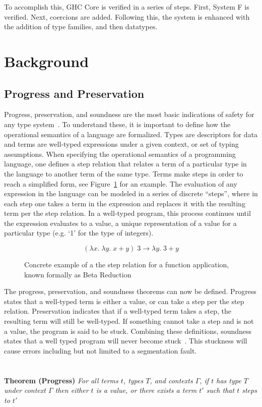 \documentclass{sig-alternate}
\begin{document}
To accomplish this, GHC Core is verified in a series of steps. First, System F is verified. Next, coercions are added. Following this, the system is enhanced with the addition of type families, and then datatypes.

\section{Background}
\label{sec:background}
\subsection{Progress and Preservation}
Progress, preservation, and soundness are the most basic indications of safety for any type system~\cite{Pierce:TAPL}. To understand these, it is important to define how the operational semantics of a language are formalized. Types are descriptors for data and terms are well-typed expressions under a given context, or set of typing assumptions. When specifying the operational semantics of a programming language, one defines a step relation that relates a term of a particular type in the language to another term of the same type. Terms make steps in order to reach a simplified form, see Figure~\ref{fig:step-ex} for an example. The evaluation of any expression in the language can be modeled in a series of discrete ``steps'', where in each step one takes a term in the expression and replaces it with the resulting term per the step relation. In a well-typed program, this process continues until the expression evaluates to a value, a unique representation of a value for a particular type (e.g. `1' for the type of integers).

\begin{figure}[h!]
  $$(\lambda x .\; \lambda y .\;x+y)\; 3 \rightarrow \lambda y.\;3+y$$
  \caption{Concrete example of a the step relation for a function application, known formally as Beta Reduction}
  \label{fig:step-ex}
\end{figure}

The progress, preservation, and soundness theorems can now be defined. Progress states that a well-typed term is either a value, or can take a step per the step relation. Preservation indicates that if a well-typed term takes a step, the resulting term will still be well-typed. If something cannot take a step and is not a value, the program is said to be stuck. Combining these definitions, soundness states that a well typed program will never become stuck~\cite{Pierce:TAPL}. This stuckness will cause errors including but not limited to a segmentation fault. \\\\\\
\noindent\textbf{Theorem (Progress)} \textit{For all terms $t$, types $T$, and contexts $\Gamma$, if $t$ has type $T$ under context $\Gamma$ then either $t$ is a value, or there exists a term $t'$ such that $t$ steps to $t'$} \\
\end{document}
